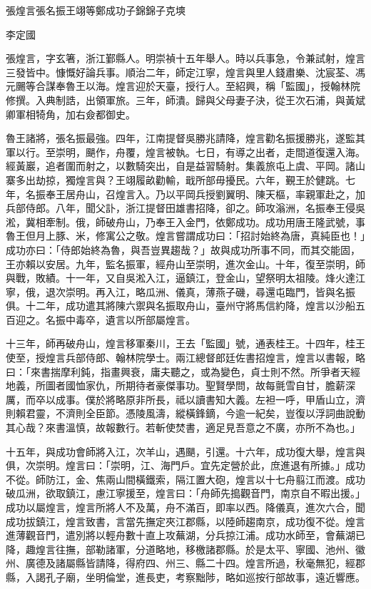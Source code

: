 
\begin{pinyinscope}
張煌言張名振王翊等鄭成功子錦錦子克塽

李定國

張煌言，字玄箸，浙江鄞縣人。明崇禎十五年舉人。時以兵事急，令兼試射，煌言三發皆中。慷慨好論兵事。順治二年，師定江寧，煌言與里人錢肅樂、沈宸荃、馮元颺等合謀奉魯王以海。煌言迎於天臺，授行人。至紹興，稱「監國」，授翰林院修撰。入典制誥，出領軍旅。三年，師潰。歸與父母妻子決，從王次石浦，與黃斌卿軍相犄角，加右僉都御史。

魯王諸將，張名振最強。四年，江南提督吳勝兆請降，煌言勸名振援勝兆，遂監其軍以行。至崇明，颶作，舟覆，煌言被執。七日，有導之出者，走間道復還入海。經黃巖，追者圍而射之，以數騎突出，自是益習騎射。集義旅屯上虞、平岡。諸山寨多出劫掠，獨煌言與？王翊履畝勸輸，戢所部毋擾民。六年，覲王於健跳。七年，名振奉王居舟山，召煌言入。乃以平岡兵授劉翼明、陳天樞，率親軍赴之，加兵部侍郎。八年，聞父訃，浙江提督田雄書招降，卻之。師攻滃洲，名振奉王侵吳淞，冀相牽制。俄，師破舟山，乃奉王入金門，依鄭成功。成功用唐王隆武號，事魯王但月上豚、米，修寓公之敬。煌言嘗謂成功曰：「招討始終為唐，真純臣也！」成功亦曰：「侍郎始終為魯，與吾豈異趨哉？」故與成功所事不同，而其交能固，王亦賴以安居。九年，監名振軍，經舟山至崇明，進次金山。十年，復至崇明，師與戰，敗績。十一年，又自吳淞入江，逼鎮江，登金山，望祭明太祖陵。烽火達江寧，俄，退次崇明。再入江，略瓜洲、儀真，薄燕子磯，尋還屯臨門，皆與名振俱。十二年，成功遣其將陳六禦與名振取舟山，臺州守將馬信約降，煌言以沙船五百迎之。名振中毒卒，遺言以所部屬煌言。

十三年，師再破舟山，煌言移軍秦川，王去「監國」號，通表桂王。十四年，桂王使至，授煌言兵部侍郎、翰林院學士。兩江總督郎廷佐書招煌言，煌言以書報，略曰：「來書揣摩利鈍，指畫興衰，庸夫聽之，或為變色，貞士則不然。所爭者天經地義，所圖者國恤家仇，所期待者豪傑事功。聖賢學問，故每氈雪自甘，膽薪深厲，而卒以成事。僕於將略原非所長，祗以讀書知大義。左袒一呼，甲盾山立，濟則賴君靈，不濟則全臣節。憑陵風濤，縱橫鋒鏑，今逾一紀矣，豈復以浮詞曲說動其心哉？來書溫慎，故報數行。若斬使焚書，適足見吾意之不廣，亦所不為也。」

十五年，與成功會師將入江，次羊山，遇颶，引還。十六年，成功復大舉，煌言與俱，次崇明。煌言曰：「崇明，江、海門戶。宜先定營於此，庶進退有所據。」成功不從。師防江，金、焦兩山間橫鐵索，隔江置大砲，煌言以十七舟翦江而渡。成功破瓜洲，欲取鎮江，慮江寧援至，煌言曰：「舟師先搗觀音門，南京自不暇出援。」成功以屬煌言，煌言所將人不及萬，舟不滿百，即率以西。降儀真，進次六合，聞成功拔鎮江，煌言致書，言當先撫定夾江郡縣，以陸師趨南京，成功復不從。煌言進薄觀音門，遣別將以輕舟數十直上攻蕪湖，分兵掠江浦。成功水師至，會蕪湖已降，趣煌言往撫，部勒諸軍，分道略地，移檄諸郡縣。於是太平、寧國、池州、徽州、廣德及諸屬縣皆請降，得府四、州三、縣二十四。煌言所過，秋毫無犯，經郡縣，入謁孔子廟，坐明倫堂，進長吏，考察黜陟，略如巡按行部故事，遠近響應。


\end{pinyinscope}
